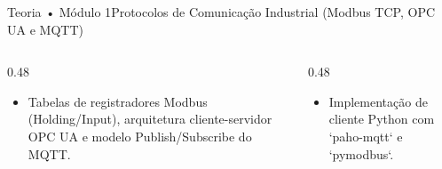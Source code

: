 \begin{senaiframe}{Teoria • Módulo 1}{Protocolos de Comunicação Industrial (Modbus TCP, OPC UA e MQTT)}
  \begin{columns}[t]
    \begin{column}{0.48\textwidth}
      \begin{tcolorbox}[senaibluecard, title={Fundamentos Teóricos}]
        \begin{itemize}
          \item Tabelas de registradores Modbus (Holding/Input), arquitetura cliente-servidor OPC UA e modelo Publish/Subscribe do MQTT.
        \end{itemize}
      \end{tcolorbox}
    \end{column}
    \begin{column}{0.48\textwidth}
      \begin{tcolorbox}[senaigreencard, title={Prática \& Laboratório}]
        \begin{itemize}
          \item Implementação de cliente Python com `paho-mqtt` e `pymodbus`.
        \end{itemize}
      \end{tcolorbox}
    \end{column}
  \end{columns}
\end{senaiframe}
